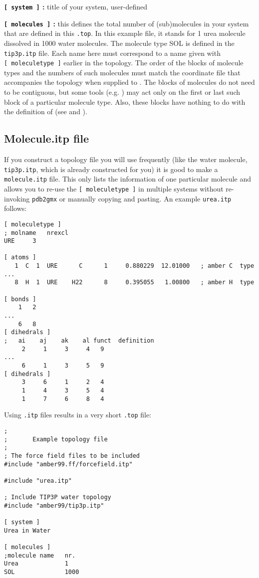 {\bf {\tt [~system~]} :} title of your system, user-defined

{\bf {\tt [~molecules~]} :} this defines the total number of (sub)molecules
in your system that are defined in this {\tt *.top}. In this
example file, it stands for 1 urea molecule dissolved in 1000 water
molecules. The molecule type SOL is defined in the {\tt tip3p.itp} file.
Each name here must correspond to a name given with {\tt [~moleculetype~]}
earlier in the topology. The order of the blocks of molecule types and
the numbers of such molecules must match the coordinate file that
accompanies the topology when supplied to {\tt {}}.
The blocks of molecules do not need to be contiguous, but some
tools (e.g. {\tt {}}) may act only on the first or
last such block of a particular molecule type. Also, these blocks
have nothing to do with the definition of 
(see  and ).

\subsection{Molecule.itp file}
\label{subsec:molitp}
If you construct a topology file you will use frequently (like the water
molecule, {\tt tip3p.itp}, which is already constructed for you) it is
good to make a {\tt molecule.itp} file. This only lists the
information of one particular molecule and allows you to re-use the
{\tt [ moleculetype ]} in multiple systems without re-invoking
{\tt pdb2gmx} or manually copying and pasting. An example
{\tt urea.itp} follows: 

{\small
\begin{verbatim}
[ moleculetype ]
; molname	nrexcl
URE		3

[ atoms ]
   1  C  1  URE      C      1     0.880229  12.01000   ; amber C  type
...
   8  H  1  URE    H22      8     0.395055   1.00800   ; amber H  type

[ bonds ]
    1	2
...
    6	8
[ dihedrals ] 
;   ai    aj    ak    al funct  definition
     2     1     3     4   9     
...
     6     1     3     5   9     
[ dihedrals ] 
     3     6     1     2   4     
     1     4     3     5   4	 
     1     7     6     8   4
\end{verbatim}}

Using {\tt *.itp} files results in a very short {\tt *.top} file:

{\small
\begin{verbatim}
;
;       Example topology file
;
; The force field files to be included
#include "amber99.ff/forcefield.itp"

#include "urea.itp"

; Include TIP3P water topology
#include "amber99/tip3p.itp"

[ system ]
Urea in Water

[ molecules ]
;molecule name   nr.
Urea             1
SOL              1000
\end{verbatim}}

